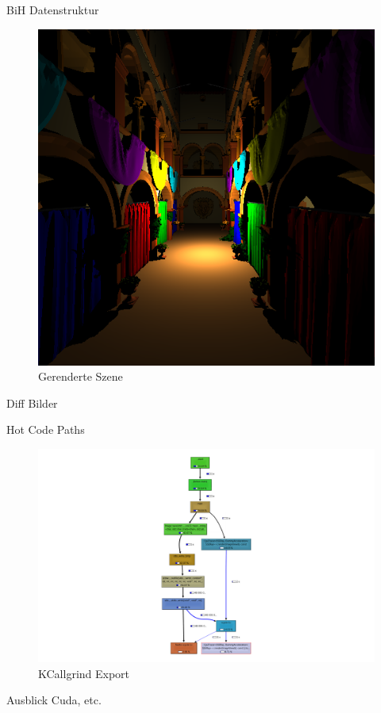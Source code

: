 \begin{frame}{BiH Datenstruktur}
\begin{figure}[ht]
\begin{minipage}[b]{0.45\linewidth}
            \includegraphics[width=\textwidth]{images/sponza.png}
            \caption{Gerenderte Szene}
            \label{fig:b}
        \end{minipage}
    \end{figure}
	\end{frame}

	\begin{frame}{Diff Bilder}
	\end{frame}

	\begin{frame}{Hot Code Paths}
		\begin{figure}[ht]
        	\begin{minipage}[b]{0.7\linewidth}
            \centering
            \includegraphics[width=\textwidth]{images/callgrind2.png}
            \caption{KCallgrind Export}
            \label{fig:a}
        	\end{minipage}
	\end{figure}
	\end{frame}

	\begin{frame}{Ausblick}
		Cuda, etc.
	\end{frame}


